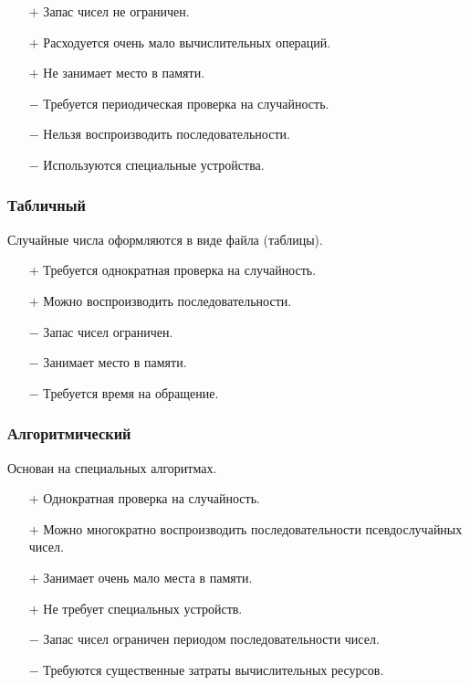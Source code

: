 \vspace{.25cm}
\begin{itemize}
    \item[$+$] Запас чисел не ограничен.
    \item[$+$] Расходуется очень мало вычислительных операций.
    \item[$+$] Не занимает место в памяти.
    \item[$-$] Требуется периодическая проверка на случайность.
    \item[$-$] Нельзя воспроизводить последовательности.
    \item[$-$] Используются специальные устройства.
\end{itemize}

\subsubsection{Табличный}

Случайные числа оформляются в виде файла (таблицы).

\begin{itemize}
    \item[$+$] Требуется однократная проверка на случайность.
    \item[$+$] Можно воспроизводить последовательности.
    \item[$-$] Запас чисел ограничен.
    \item[$-$] Занимает место в памяти.
    \item[$-$] Требуется время на обращение.
\end{itemize}

\subsubsection{Алгоритмический}

Основан на специальных алгоритмах.

\begin{itemize}
    \item[$+$] Однократная проверка на случайность.
    \item[$+$] Можно многократно воспроизводить последовательности псевдослучайных чисел.
    \item[$+$] Занимает очень мало места в памяти.
    \item[$+$] Не требует специальных устройств.
    \item[$-$] Запас чисел ограничен периодом последовательности чисел.
    \item[$-$] Требуются существенные затраты вычислительных ресурсов.
\end{itemize}

